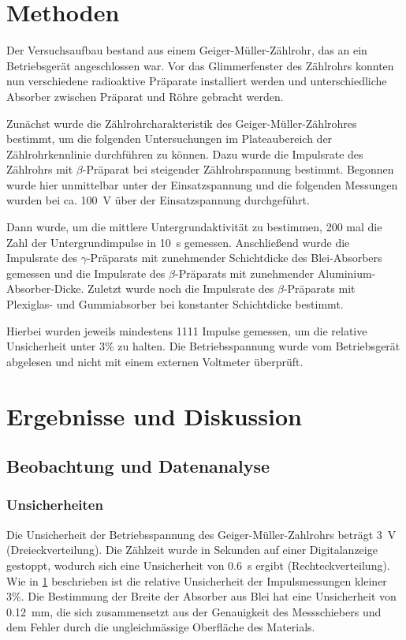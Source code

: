 \documentclass[
	a4paper,
	12pt,
	pagesize,
	ngerman
]{scrartcl}
\begin{document}
	\section{Methoden}\label{Methoden}
	Der Versuchsaufbau bestand aus einem Geiger-Müller-Zählrohr, das an ein Betriebsgerät angeschlossen war.
	Vor das Glimmerfenster des Zählrohrs konnten nun verschiedene radioaktive Präparate installiert werden und unterschiedliche Absorber zwischen Präparat und Röhre gebracht werden.
	
	Zunächst wurde die Zählrohrcharakteristik des Geiger-Müller-Zählrohres bestimmt, um die folgenden Untersuchungen im Plateaubereich der Zählrohrkennlinie durchführen zu können.
	Dazu wurde die Impulsrate des Zählrohrs mit $\beta$-Präparat bei steigender Zählrohrspannung bestimmt.
	Begonnen wurde hier unmittelbar unter der Einsatzspannung und die folgenden Messungen wurden bei ca. \SI{100}{\volt} über der Einsatzspannung durchgeführt.
	
	Dann wurde, um die mittlere Untergrundaktivität zu bestimmen, 200 mal die Zahl der Untergrundimpulse in \SI{10}{\second} gemessen.
	Anschließend wurde die Impulsrate des $\gamma$-Präparats mit zunehmender Schichtdicke des Blei-Absorbers gemessen und die Impulsrate des $\beta$-Präparats mit zunehmender Aluminium-Absorber-Dicke.
	Zuletzt wurde noch die Impulsrate des $\beta$-Präparats mit Plexiglas- und Gummiabsorber bei konstanter Schichtdicke bestimmt.
	
	Hierbei wurden jeweils mindestens 1111 Impulse gemessen, um die relative Unsicherheit unter 3\% zu halten.
	Die Betriebsspannung wurde vom Betriebsgerät abgelesen und nicht mit einem externen Voltmeter überprüft.
	
	
	\section{Ergebnisse und Diskussion}
	

	
	\subsection{Beobachtung und Datenanalyse}
	\subsubsection{Unsicherheiten} %
	Die Unsicherheit der Betriebsspannung des Geiger-Müller-Zahlrohrs beträgt \SI{3}{V} (Dreieckverteilung).  
	Die Zählzeit wurde in Sekunden auf einer Digitalanzeige gestoppt, wodurch sich eine Unsicherheit von \SI{0,6}{s} ergibt (Rechteckverteilung).
	Wie in \cref{Methoden} beschrieben ist die relative Unsicherheit der Impulsmessungen kleiner 3\%.
	Die Bestimmung der Breite der Absorber aus Blei hat eine Unsicherheit von \SI{0,12}{mm}, die sich zusammensetzt aus der Genauigkeit des Messschiebers und dem Fehler durch die ungleichmässige Oberfläche des Materials.
	
\end{document}
